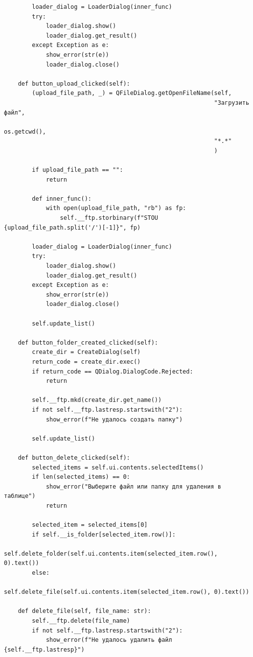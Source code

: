 \documentclass[a4paper,14pt]{extarticle}
\begin{document}
\begin{verbatim}
        loader_dialog = LoaderDialog(inner_func)
        try:
            loader_dialog.show()
            loader_dialog.get_result()
        except Exception as e:
            show_error(str(e))
            loader_dialog.close()

    def button_upload_clicked(self):
        (upload_file_path, _) = QFileDialog.getOpenFileName(self,
                                                            "Загрузить файл",
                                                            os.getcwd(),
                                                            "*.*"
                                                            )

        if upload_file_path == "":
            return

        def inner_func():
            with open(upload_file_path, "rb") as fp:
                self.__ftp.storbinary(f"STOU {upload_file_path.split('/')[-1]}", fp)

        loader_dialog = LoaderDialog(inner_func)
        try:
            loader_dialog.show()
            loader_dialog.get_result()
        except Exception as e:
            show_error(str(e))
            loader_dialog.close()

        self.update_list()

    def button_folder_created_clicked(self):
        create_dir = CreateDialog(self)
        return_code = create_dir.exec()
        if return_code == QDialog.DialogCode.Rejected:
            return

        self.__ftp.mkd(create_dir.get_name())
        if not self.__ftp.lastresp.startswith("2"):
            show_error(f"Не удалось создать папку")

        self.update_list()

    def button_delete_clicked(self):
        selected_items = self.ui.contents.selectedItems()
        if len(selected_items) == 0:
            show_error("Выберите файл или папку для удаления в таблице")
            return

        selected_item = selected_items[0]
        if self.__is_folder[selected_item.row()]:
            self.delete_folder(self.ui.contents.item(selected_item.row(), 0).text())
        else:
            self.delete_file(self.ui.contents.item(selected_item.row(), 0).text())

    def delete_file(self, file_name: str):
        self.__ftp.delete(file_name)
        if not self.__ftp.lastresp.startswith("2"):
            show_error(f"Не удалось удалить файл {self.__ftp.lastresp}")


\end{verbatim}
\end{document}
